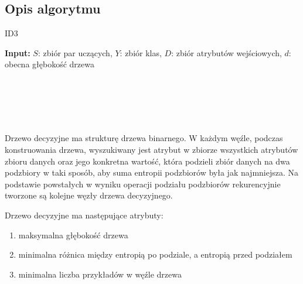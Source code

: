 \documentclass[
    left=2.5cm,         %
    right=2.5cm,        %
    top=2.5cm,          %
    bottom=3cm,         %
    bindingoffset=6mm,  %
    nohyphenation=false %
]{eiti/eiti-report}
\DeclareMathOperator{\argmin}{arg\,min}
\begin{document}
\subsection{Opis algorytmu}


\begin{algorithm}
\caption{ID3}\label{alg:cap}
\hspace*{\algorithmicindent} \textbf{Input:} \begin{math}\mathit{S}\end{math}: zbiór par uczących, \begin{math}\mathit{Y}\end{math}: zbiór klas, $D$: zbiór atrybutów wejściowych, \begin{math}\mathit{d}\end{math}: obecna głębokość drzewa
\begin{algorithmic}[1]
    \Return
\EndIf\\

\\
\EndIf\\


\State{\begin{math} (j,t)=\argmin_{j,t}{H(S)} \end{math}}
\EndIf \\

\end{algorithmic}
\end{algorithm}

Drzewo decyzyjne ma strukturę drzewa binarnego. W każdym węźle, podczas konstruowania drzewa, wyszukiwany jest atrybut w zbiorze wszystkich atrybutów zbioru danych oraz jego konkretna wartość, która podzieli zbiór danych na dwa podzbiory w taki sposób, aby suma entropii podzbiorów była jak najmniejsza. Na podstawie powstałych w wyniku operacji podziału podzbiorów rekurencyjnie tworzone są kolejne węzły drzewa decyzyjnego.

Drzewo decyzyjne ma następujące atrybuty:
\begin{enumerate}
    \item maksymalna głębokość drzewa
    \item minimalna różnica między entropią po podziale, a entropią przed podziałem
    \item minimalna liczba przykładów w węźle drzewa
\end{enumerate}
\end{document}
